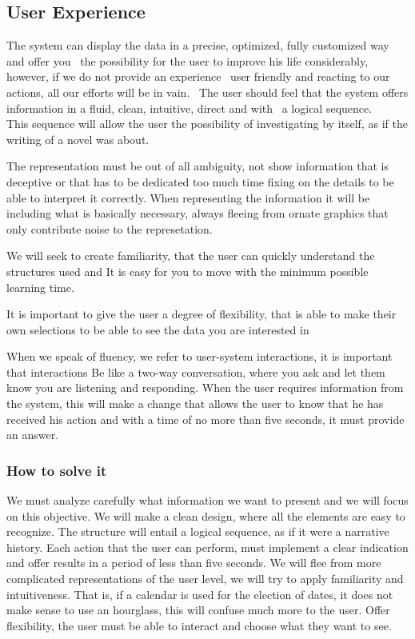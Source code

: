\subsection{User Experience}
The system can display the data in a precise, optimized, fully customized way and offer you
 the possibility for the user to improve his life considerably, however, if we do not provide an experience
 user friendly and reacting to our actions, all our efforts will be in vain.
 The user should feel that the system offers information in a fluid, clean, intuitive, direct and with
 a logical sequence.
  
This sequence will allow the user the possibility of investigating by itself, as if the writing of a novel was about.

The representation must be out of all ambiguity, not show information that is deceptive or that has to be dedicated
too much time fixing on the details to be able to interpret it correctly. When representing the information it will be
including what is basically necessary, always fleeing from ornate graphics that only contribute noise to the represetation.

We will seek to create familiarity, that the user can quickly understand the structures used and
It is easy for you to move with the minimum possible learning time.

It is important to give the user a degree of flexibility, that is able to make their own selections to be able to see
the data you are interested in

When we speak of fluency, we refer to user-system interactions, it is important that interactions
Be like a two-way conversation, where you ask and let them know you are listening and responding. When the user
requires information from the system, this will make a change that allows the user to know that he has received his action and
with a time of no more than five seconds, it must provide an answer.
    
\subsubsection{How to solve it} 
We must analyze carefully what information we want to present and we will focus on this objective. We will make a
clean design, where all the elements are easy to recognize.
The structure will entail a logical sequence, as if it were a narrative history.
Each action that the user can perform, must implement a clear indication and offer results in a
period of less than five seconds.
We will flee from more complicated representations of the user level, we will try to apply familiarity and intuitiveness.
That is, if a calendar is used for the election of dates, it does not make sense to use an hourglass, this will confuse
much more to the user.
Offer flexibility, the user must be able to interact and choose what they want to see.

